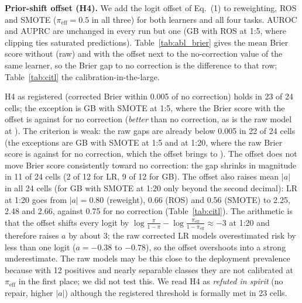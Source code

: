 \textbf{Prior-shift offset (H4).} We add the logit offset of Eq.~(1) to reweighting, ROS and SMOTE ($\pi_{\text{eff}}=0.5$ in all three) for both learners and all four tasks. AUROC and AUPRC are unchanged in every run but one (GB with ROS at 1:5, where clipping ties saturated predictions). Table~\ref{tab:abl_brier} gives the mean Brier score without (raw) and with the offset next to the no-correction value of the same learner, so the Brier gap to no correction is the difference to that row; Table~\ref{tab:citl} the calibration-in-the-large.

\begin{table}[t]\centering\caption{Prior-shift ablation: mean Brier score over 10 seeds, raw versus with logit offset; the no-correction row of the same learner is the reference for the Brier gap discussed in the text.}\label{tab:abl_brier}
\small
\end{table}

\begin{table}[t]\centering\caption{Calibration-in-the-large, mean of 10 seeds: signed $a$ ($>0$: risk underestimated), $|a|$, and $|a|_{\text{off}}$ with the prior-shift offset. $^{*}$: $a$ differs from no correction, same learner, unadjusted paired $p<0.05$.}\label{tab:citl}
\small
\end{table}

H4 as registered (corrected Brier within 0.005 of no correction) holds in 23 of 24 cells; the exception is GB with SMOTE at 1:5, where the Brier score with the offset is  against  for no correction (\emph{better} than no correction, as is the raw model at ). The criterion is weak: the raw gaps are already below 0.005 in 22 of 24 cells (the exceptions are GB with SMOTE at 1:5 and at 1:20, where the raw Brier score is  against  for no correction, which the offset brings to ). The offset does not move Brier score consistently toward no correction: the gap shrinks in magnitude in 11 of 24 cells (2 of 12 for LR, 9 of 12 for GB). The offset also raises mean $|a|$ in all 24 cells (for GB with SMOTE at 1:20 only beyond the second decimal): LR at 1:20 goes from $|a|=0.80$ (reweight), 0.66 (ROS) and 0.56 (SMOTE) to 2.25, 2.48 and 2.66, against 0.75 for no correction (Table~\ref{tab:citl}). The arithmetic is that the offset shifts every logit by $\log\frac{\pi}{1-\pi}-\log\frac{\pi_{\text{eff}}}{1-\pi_{\text{eff}}}\approx -3$ at 1:20 and therefore raises $a$ by about $3$; the raw corrected LR models overestimated risk by less than one logit ($a=-0.38$ to $-0.78$), so the offset overshoots into a strong underestimate. The raw models may be this close to the deployment prevalence because with 12 positives and nearly separable classes they are not calibrated at $\pi_{\text{eff}}$ in the first place; we did not test this. We read H4 as \emph{refuted in spirit} (no repair, higher $|a|$) although the registered threshold is formally met in 23 cells.

